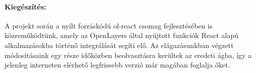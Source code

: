 \paragraph{Kiegészítés:}
A projekt során a nyílt forráskódú ol-react csomag fejlesztésében is
közreműködtünk, amely az OpenLayers által nyújtott funkciók React alapú
alkalmazásokba történő integrálását segíti elő. Az elágazásunkban végzett
módosításaink egy része időközben beolvasztásra kerültek az eredeti ágba, így a
jelenleg interneten elérhető legfrissebb verzió már magában foglalja őket.
